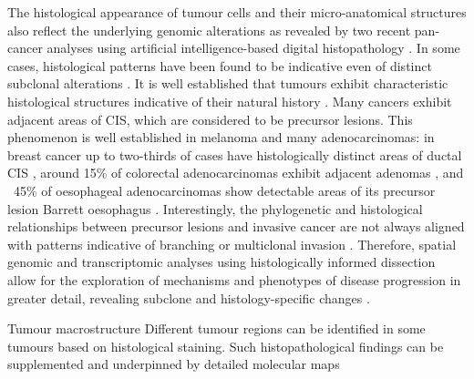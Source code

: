 \label{sec:intro-histology}

The histological appearance of tumour cells and their micro-anatomical structures also reflect the underlying genomic alterations as revealed by two recent pan-cancer analyses using artificial intelligence-based digital histopathology \parencite{Kather2020-bt,Fu2020-cp}. In some cases, histological patterns have been found to be indicative even of distinct subclonal alterations \parencite{Lomakin2022-ks,Coudray2018-jm,Loeffler2022-xj}. It is well established that tumours exhibit characteristic histological structures indicative of their natural history . Many cancers exhibit adjacent areas of \acl{CIS}, which are considered to be precursor lesions. This phenomenon is well established in melanoma \parencite{Nirmal2022-sq} and many adenocarcinomas: in breast cancer up to two-thirds of cases have histologically distinct areas of ductal \acl{CIS} \parencite{Kole2019-hl}, around 15\% of colorectal adenocarcinomas exhibit adjacent adenomas \parencite{Ponz_de_Leon1990-zy}, and ~45\% of oesophageal adenocarcinomas show detectable areas of its precursor lesion Barrett oesophagus \parencite{Sawas2018-mt}. Interestingly, the phylogenetic and histological relationships between precursor lesions and invasive cancer are not always aligned with patterns indicative of branching \parencite{Ross-Innes2015-sq,Stachler2015-ca} or multiclonal invasion \parencite{Casasent2018-gx}. Therefore, spatial genomic and transcriptomic analyses using histologically informed dissection allow for the exploration of mechanisms and phenotypes of disease progression in greater detail, revealing subclone and histology-specific changes \parencite{Lomakin2022-ks}.

    {Tumour macrostructure \parencite{Seferbekova2023-wg}}
    {Different tumour regions can be identified in some tumours based on histological staining. Such histopathological findings can be supplemented and underpinned by detailed molecular maps}

